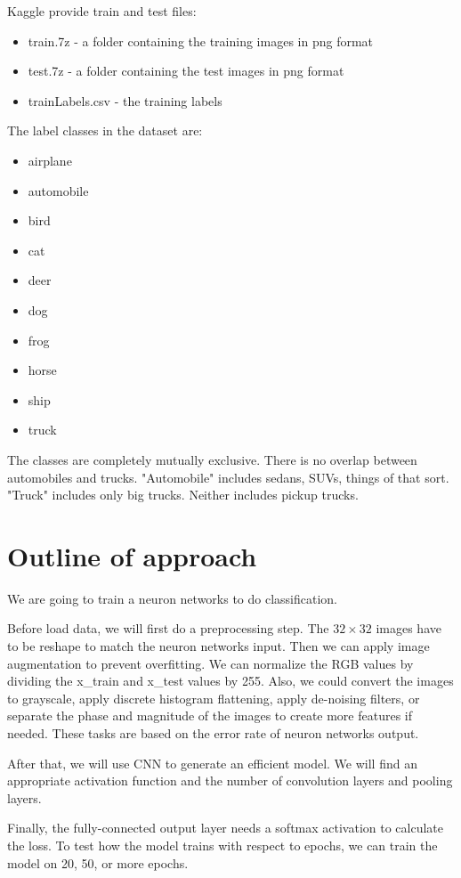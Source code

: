\documentclass{article}
\begin{document}
Kaggle provide train and test files:
\begin{itemize}
    \item train.7z - a folder containing the training images in png format
    \item test.7z - a folder containing the test images in png format
    \item trainLabels.csv - the training labels
\end{itemize}

The label classes in the dataset are:
\begin{itemize}
    \item airplane 
    \item automobile 
    \item bird 
    \item cat 
    \item deer 
    \item dog 
    \item frog 
    \item horse 
    \item ship 
    \item truck
\end{itemize}

The classes are completely mutually exclusive. There is no overlap between automobiles and trucks. "Automobile" includes sedans, SUVs, things of that sort. "Truck" includes only big trucks. Neither includes pickup trucks.

\section{Outline of approach}
\hspace{1.5em}We are going to train a neuron networks to do classification.

Before load data, we will first do a preprocessing step. The $32\times32$ images have to be reshape to match the neuron networks input.
Then we can apply image augmentation to prevent overfitting. We can normalize the RGB values by dividing the x\_train and x\_test values by 255.
Also, we could convert the images to grayscale, apply discrete histogram flattening, apply de-noising filters, or separate the phase and magnitude of the images to create more features if needed. These tasks are based on the error rate of neuron networks output.

After that, we will use CNN to generate an efficient model. We will find an appropriate activation function and the number of convolution layers and pooling layers.

Finally, the fully-connected output layer needs a softmax activation to calculate the loss. To test how the model trains with respect to epochs, we can train the model on 20, 50, or more epochs.
\end{document}
